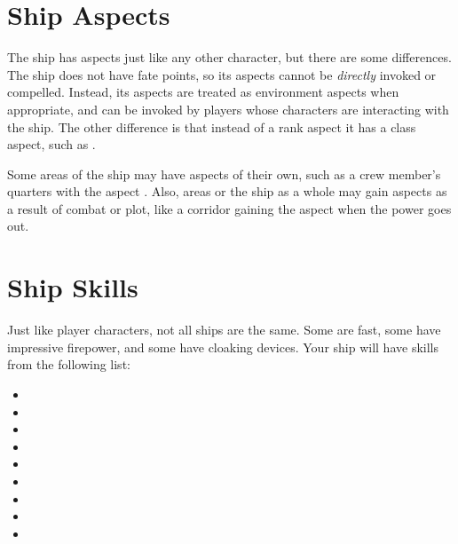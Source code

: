 \documentclass[12pt,titlepage,openany]{book}
\begin{document}
\section{Ship Aspects}\label{sec:ship-aspects}
The ship has aspects just like any other character, but there are some
differences. The ship does not have fate points, so its aspects cannot be
\emph{directly} invoked or compelled. Instead, its aspects are treated as
environment aspects when appropriate, and can be invoked by players whose
characters are interacting with the ship. The other difference is that instead
of a rank aspect it has a class aspect, such as .

Some areas of the ship may have aspects of their own, such as a crew member's
quarters with the aspect . Also, areas or the ship
as a whole may gain aspects as a result of combat or plot, like a corridor
gaining the aspect  when the power goes out.

\section{Ship Skills}\label{sec:ship-skills}
Just like player characters, not all ships are the same. Some are fast, some
have impressive firepower, and some have cloaking devices. Your ship will have
skills from the following list:

\begin{multicols}{3}
    \raggedcolumns
    \begin{itemize}
        \item {}
        \item {}
        \item {}
        \item {}
        \item {}
        \item {}
        \item {}
        \item {}
        \item {}
    \end{itemize}
\end{multicols}
\end{document}
